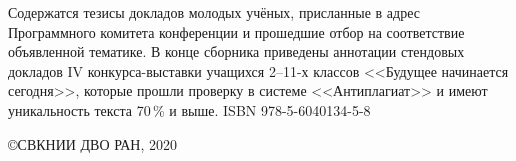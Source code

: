 \vfill
\vfill
Содержатся тезисы докладов молодых учёных, присланные в адрес Программного комитета конференции и прошедшие отбор на соответствие объявленной тематике. В конце сборника приведены аннотации стендовых докладов IV конкурса-выставки учащихся 2--11-х классов <<Будущее начинается сегодня>>, которые прошли проверку в системе <<Антиплагиат>> и имеют уникальность текста 70\,\% и выше.
\vfill
  \bigskip
\noindent ISBN 978-5-6040134-5-8
\hfill \begin{minipage}[t][3cm][t]{0.38\textwidth}
\copyright СВКНИИ ДВО РАН, 2020
\end{minipage}
